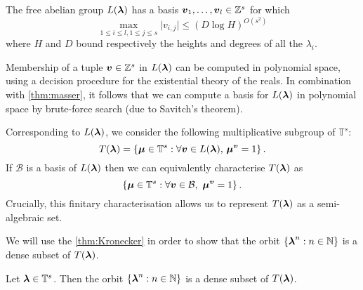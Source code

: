 \begin{theorem}[Masser]
\label{thm:masser}
The free abelian group $L(\boldsymbol{\lambda})$ has a basis $\boldsymbol{v}_1, \ldots, \boldsymbol{v}_{l} \in \mathbb{Z}^{s}$ for which
\[ \max\limits_{1\leq i\leq l,1\leq j\leq s} \lvert v_{i,j} \rvert \leq (D\log H)^{O(s^2)} \]
where $H$ and $D$ bound respectively the heights and degrees of all the $\lambda_{i}$.
\end{theorem}
Membership of a tuple $\boldsymbol{v}\in \mathbb{Z}^{s}$ in $L(\boldsymbol{\lambda})$ can be computed in polynomial space, using a decision procedure for the existential theory of the reals. In combination with \cref{thm:masser}, it follows that we can compute a basis for $L(\boldsymbol{\lambda})$ in polynomial space by brute-force search (due to Savitch's theorem).

Corresponding to $L(\boldsymbol{\lambda})$, we consider the following
multiplicative subgroup of $\mathbb{T}^{s}$:
\begin{equation*}
T(\boldsymbol{\lambda})=\lbrace \boldsymbol{\mu} \in \mathbb{T}^{s} : \forall \boldsymbol{v} \in L(\boldsymbol{\lambda}), \, \boldsymbol{\mu}^{\boldsymbol{v}} = 1 \rbrace \, .
\end{equation*}
If $\mathcal{B}$ is a basis of $L(\boldsymbol{\lambda})$ then we can
equivalently characterise $T(\boldsymbol{\lambda})$ as
\begin{equation*}
\lbrace \boldsymbol{\mu} \in \mathbb{T}^{s}: \forall \boldsymbol{v} \in \mathcal{B}, \, \, \boldsymbol{\mu}^{\boldsymbol{v}} = 1 \rbrace \, .
\end{equation*}
Crucially, this finitary characterisation allows us to represent $T(\boldsymbol\lambda)$ as a semi-algebraic set.

We will use the \cref{thm:Kronecker} in order to show that the orbit $\lbrace
\boldsymbol\lambda^n : n\in\mathbb{N} \rbrace$ is a dense subset of
$T(\boldsymbol{\lambda})$.

\begin{theorem}
\label{dense}
Let $\boldsymbol{\lambda}\in\mathbb{T}^s$. Then the orbit $\lbrace \boldsymbol\lambda^n : n\in\mathbb{N} \rbrace$ is a dense subset of $T(\boldsymbol{\lambda})$.
\end{theorem}

